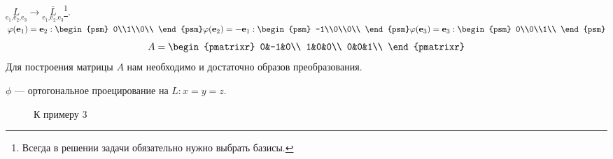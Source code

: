 \noindent$\underset{\text{e$_1$,e$_2$,e$_3$}}{L}\rightarrow\underset{\text{e$_1$,e$_2$,e$_3$}}{\overline{L}}$\footnote{Всегда в решении задачи обязательно нужно выбрать базисы.}.\\
$\phi(\textbf{e$_1$})=\textbf{e$_2$}: \begin{psm}
0\\1\\0\\
\end{psm}\\
\phi(\textbf{e$_2$})=-\textbf{e$_1$}: \begin{psm}
-1\\0\\0\\
\end{psm}\\
\phi(\textbf{\text{e$_3$}})=\textbf{e$_3$}:\begin{psm}
0\\0\\1\\
\end{psm}$\\
$$A=\begin{pmatrixr}
0&-1&0\\
1&0&0\\
0&0&1\\	
\end{pmatrixr}$$
Для построения матрицы $A$ нам необходимо и достаточно образов преобразования.
\begin{prim}
	$\phi$ --- ортогональное проецирование на $L: x=y=z$.
\end{prim}

\begin{wrapfigure}{r}{0.35\linewidth}
	\def\svgwidth{6cm} %
	
	\caption{К примеру 3}
	\label{...}
	\vspace{-9cm}
\end{wrapfigure}

